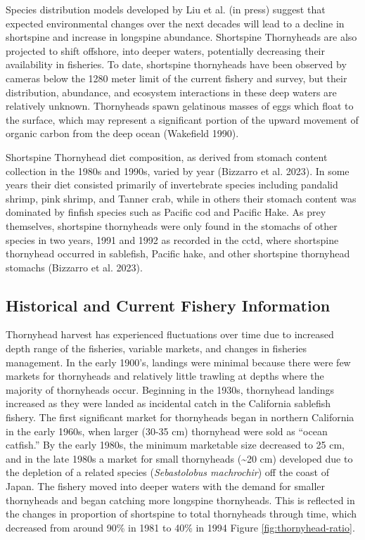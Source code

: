 \documentclass[11pt,
  english,
  letterpaper,
]{article}
\begin{document}
Species distribution models developed by Liu et al. (in press) suggest that expected environmental changes over the next decades will lead to a decline in shortspine and increase in longspine abundance. Shortspine Thornyheads are also projected to shift offshore, into deeper waters, potentially decreasing their availability in fisheries. To date, shortspine thornyheads have been observed by cameras below the 1280 meter limit of the current fishery and survey, but their distribution, abundance, and ecosystem interactions in these deep waters are relatively unknown. Thornyheads spawn gelatinous masses of eggs which float to the surface, which may represent a significant portion of the upward movement of organic carbon from the deep ocean (Wakefield 1990).

Shortspine Thornyhead diet composition, as derived from stomach content collection in the 1980s and 1990s, varied by year (Bizzarro et al. 2023). In some years their diet consisted primarily of invertebrate species including pandalid shrimp, pink shrimp, and Tanner crab, while in others their stomach content was dominated by finfish species such as Pacific cod and Pacific Hake. As prey themselves, shortspine thornyheads were only found in the stomachs of other species in two years, 1991 and 1992 as recorded in the \gls{cctd}, where shortspine thornyhead occurred in sablefish, Pacific hake, and other shortspine thornyhead stomachs (Bizzarro et al. 2023).

\hypertarget{historical-and-current-fishery-information}{%
\subsection{Historical and Current Fishery Information}\label{historical-and-current-fishery-information}}

Thornyhead harvest has experienced fluctuations over time due to increased depth range of the fisheries, variable markets, and changes in fisheries management. In the early 1900's, landings were minimal because there were few markets for thornyheads and relatively little trawling at depths where the majority of thornyheads occur. Beginning in the 1930s, thornyhead landings increased as they were landed as incidental catch in the California sablefish fishery. The first significant market for thornyheads began in northern California in the early 1960s, when larger (30-35 cm) thornyhead were sold as ``ocean catfish.'' By the early 1980s, the minimum marketable size decreased to 25 cm, and in the late 1980s a market for small thornyheads (\textasciitilde20 cm) developed due to the depletion of a related species (\emph{Sebastolobus machrochir}) off the coast of Japan. The fishery moved into deeper waters with the demand for smaller thornyheads and began catching more longspine thornyheads. This is reflected in the changes in proportion of shortspine to total thornyheads through time, which decreased from around 90\% in 1981 to 40\% in 1994 Figure \ref{fig:thornyhead-ratio}.
\end{document}
